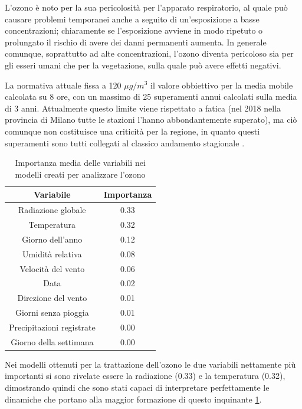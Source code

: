 \documentclass[a4paper,12pt]{report}
\begin{document}
L'ozono è noto per la sua pericolosità per l'apparato respiratorio, al quale può causare problemi temporanei anche a seguito di un'esposizione a basse concentrazioni; chiaramente se l'esposizione avviene in modo ripetuto o prolungato il rischio di avere dei danni permanenti aumenta. In generale comunque, soprattutto ad alte concentrazioni, l'ozono diventa pericoloso sia per gli esseri umani che per la vegetazione, sulla quale può avere effetti negativi.

La normativa attuale fissa a 120 $\mu g/m^3$ il valore obbiettivo per la media mobile calcolata su 8 ore, con un massimo di 25 superamenti annui calcolati sulla media di 3 anni. Attualmente questo limite viene rispettato a fatica (nel 2018 nella provincia di Milano tutte le stazioni l'hanno abbondantemente superato), ma ciò comunque non costituisce una criticità per la regione, in quanto questi superamenti sono tutti collegati al classico andamento stagionale \cite{arpa2018rapporto}.

\begin{table}[h!]
\centering
\begin{tabular}{ |c c| }
	\hline
	Variabile & Importanza \\
	\hline
	Radiazione globale & 0.33 \\
	Temperatura & 0.32 \\
	Giorno dell'anno & 0.12 \\
	Umidità relativa & 0.08 \\
	Velocità del vento & 0.06 \\
	Data & 0.02 \\
	Direzione del vento & 0.01 \\
	Giorni senza pioggia & 0.01 \\
	Precipitazioni registrate & 0.00 \\
	Giorno della settimana & 0.00 \\
	\hline
\end{tabular}
\caption{Importanza media delle variabili nei modelli creati per analizzare l'ozono}
\label{table:importanza_o3}
\end{table}

Nei modelli ottenuti per la trattazione dell'ozono le due variabili nettamente più importanti si sono rivelate essere la radiazione (0.33) e la temperatura (0.32), dimostrando quindi che sono stati capaci di interpretare perfettamente le dinamiche che portano alla maggior formazione di questo inquinante \ref{table:importanza_o3}.
\end{document}
